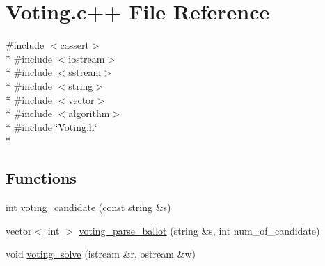 \hypertarget{Voting_8c_09_09}{\section{Voting.\-c++ File Reference}
\label{Voting_8c_09_09}
}
{\ttfamily \#include $<$cassert$>$}\\*
{\ttfamily \#include $<$iostream$>$}\\*
{\ttfamily \#include $<$sstream$>$}\\*
{\ttfamily \#include $<$string$>$}\\*
{\ttfamily \#include $<$vector$>$}\\*
{\ttfamily \#include $<$algorithm$>$}\\*
{\ttfamily \#include \char`\"{}Voting.\-h\char`\"{}}\\*
\subsection*{Functions}
\begin{DoxyCompactItemize}
\item 
int \hyperlink{Voting_8c_09_09_ad514f6616c181c70aedb499941f2f1c1}{voting\-\_\-candidate} (const string \&s)
\item 
vector$<$ int $>$ \hyperlink{Voting_8c_09_09_a3c01d376b869575ba567bf7b31cd3448}{voting\-\_\-parse\-\_\-ballot} (string \&s, int num\-\_\-of\-\_\-candidate)
\item 
void \hyperlink{Voting_8c_09_09_aed21eca169108fbf5b77db1e7e21af2e}{voting\-\_\-solve} (istream \&r, ostream \&w)
\end{DoxyCompactItemize}


